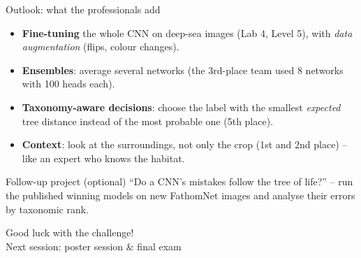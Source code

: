 \documentclass[aspectratio=169,11pt]{beamer}
\begin{document}
\begin{frame}{Outlook: what the professionals add}
\small
\begin{itemize}
  \item \textbf{Fine-tuning} the whole CNN on deep-sea images (Lab 4, Level 5), with \emph{data augmentation} (flips, colour changes).
  \item \textbf{Ensembles}: average several networks (the 3rd-place team used 8 networks with 100 heads each).
  \item \textbf{Taxonomy-aware decisions}: choose the label with the smallest \emph{expected} tree distance instead of the most probable one (5th place).
  \item \textbf{Context}: look at the surroundings, not only the crop (1st and 2nd place) -- like an expert who knows the habitat.
\end{itemize}
\vspace{4pt}
\begin{exampleblock}{Follow-up project (optional)}
``Do a CNN's mistakes follow the tree of life?'' -- run the published winning models on new FathomNet images and analyse their errors by taxonomic rank.
\end{exampleblock}
\end{frame}

\begin{frame}[standout]
Good luck with the challenge!\\[8pt]
\normalsize Next session: poster session \& final exam
\end{frame}
\end{document}
